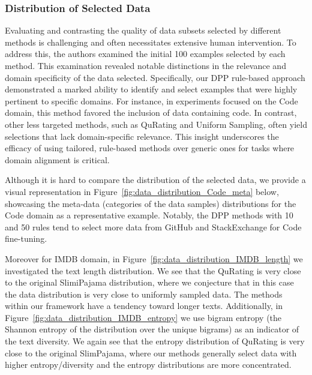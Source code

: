 \documentclass{article}
\begin{document}
\subsubsection{Distribution of Selected Data}
Evaluating and contrasting the quality of data subsets selected by different methods is challenging and often necessitates extensive human intervention. To address this, the authors examined the initial 100 examples selected by each method. This examination revealed notable distinctions in the relevance and domain specificity of the data selected. Specifically, our DPP rule-based approach demonstrated a marked ability to identify and select examples that were highly pertinent to specific domains. For instance, in experiments focused on the Code domain, this method favored the inclusion of data containing code. In contrast, other less targeted methods, such as QuRating and Uniform Sampling, often yield selections that lack domain-specific relevance. This insight underscores the efficacy of using tailored, rule-based methods over generic ones for tasks where domain alignment is critical.

Although it is hard to compare the distribution of the selected data,  we provide a visual representation in Figure~\ref{fig:data_distribution_Code_meta} below, showcasing the meta-data (categories of the data samples) distributions for the Code domain as a representative example. Notably, the DPP methods with 10 and 50 rules tend to select more data from GitHub and StackExchange for Code fine-tuning.

Moreover for IMDB domain, in Figure~\ref{fig:data_distribution_IMDB_length} we investigated the text length distribution. We see that the QuRating is very close to the original SlimiPajama distribution, where we conjecture that in this case the data distribution is very close to uniformly sampled data. The methods within our framework have a tendency toward longer texts. Additionally, in Figure~\ref{fig:data_distribution_IMDB_entropy} we use bigram entropy (the Shannon entropy of the distribution over the unique bigrams) as an indicator of the text diversity. We again see that the entropy distribution of QuRating is very close to the original SlimPajama, where our methods generally select data with higher entropy/diversity and the entropy distributions are more concentrated.
\end{document}
